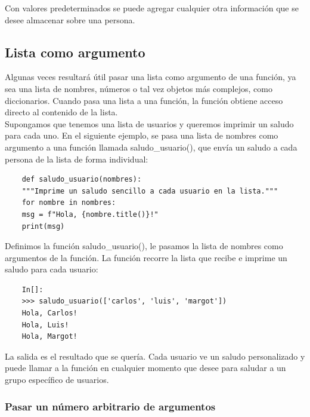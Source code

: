 Con valores predeterminados se puede agregar cualquier otra información que se desee almacenar sobre una persona.


\subsection{Lista como argumento}

Algunas veces resultará útil pasar una lista como argumento de una función, ya sea una lista de nombres, números o tal vez objetos más complejos, como diccionarios. Cuando pasa una lista a una función, la función obtiene acceso directo al contenido de la lista.\\ 


Supongamos  que tenemos una lista de usuarios y queremos imprimir un saludo para cada uno. 
En el siguiente ejemplo,  se pasa una lista de nombres como argumento a una función llamada {\ttfamily saludo\_usuario()}, que envía un  saludo a cada persona de la lista de forma individual:

\hspace{-2.3cm}{\ttfamily \scriptsize saludo.py}\vspace{-0.5cm}
\begin{lstlisting}		
	def saludo_usuario(nombres):
	"""Imprime un saludo sencillo a cada usuario en la lista."""
	for nombre in nombres:
	msg = f"Hola, {nombre.title()}!"
	print(msg)
\end{lstlisting}
Definimos la función {\ttfamily saludo\_usuario()}, le pasamos la lista de nombres como argumentos de la función. La función recorre la lista que recibe e imprime un saludo para cada usuario:
\begin{lstlisting}
	In[]:	
	>>> saludo_usuario(['carlos', 'luis', 'margot'])
	Hola, Carlos!
	Hola, Luis!
	Hola, Margot!			
\end{lstlisting}

La salida es el resultado que se quería. Cada usuario ve un saludo personalizado y puede llamar a la 
función en cualquier momento que desee para saludar a un grupo específico de usuarios.


\subsubsection{Pasar un número arbitrario de argumentos}

